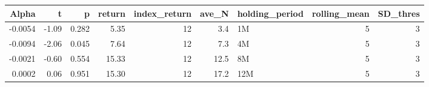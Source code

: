 \begin{table}[ht]
\centering
\begin{tabular}{rrrrrrlrr}
  \hline
Alpha & t & p & return & index\_return & ave\_N & holding\_period & rolling\_mean & SD\_thres \\ 
  \hline
-0.0054 & -1.09 & 0.282 & 5.35 & 12 & 3.4 & 1M &  5 &  3 \\ 
  -0.0094 & -2.06 & 0.045 & 7.64 & 12 & 7.3 & 4M &  5 &  3 \\ 
  -0.0021 & -0.60 & 0.554 & 15.33 & 12 & 12.5 & 8M &  5 &  3 \\ 
  0.0002 & 0.06 & 0.951 & 15.30 & 12 & 17.2 & 12M &  5 &  3 \\ 
   \hline
\end{tabular}
\end{table}

